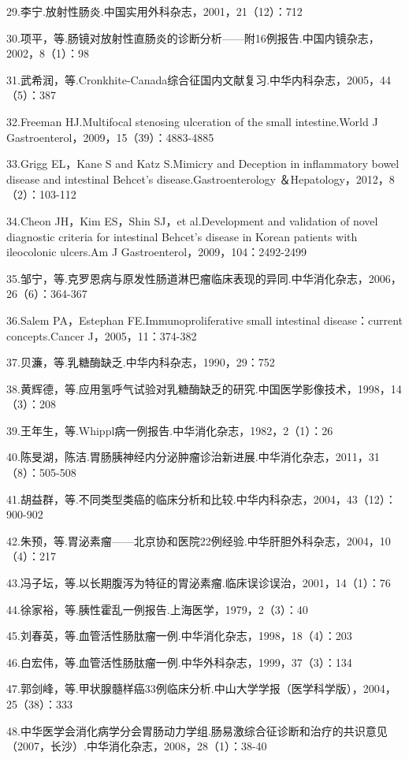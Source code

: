 29.李宁.放射性肠炎.中国实用外科杂志，2001，21（12）：712

30.项平，等.肠镜对放射性直肠炎的诊断分析------附16例报告.中国内镜杂志，2002，8（1）：98

31.武希润，等.Cronkhite-Canada综合征国内文献复习.中华内科杂志，2005，44（5）：387

32.Freeman HJ.Multifocal stenosing ulceration of the small
intestine.World J Gastroenterol，2009，15（39）：4883-4885

33.Grigg EL，Kane S and Katz S.Mimicry and Deception in inflammatory
bowel disease and intestinal Behcet's disease.Gastroenterology
＆Hepatology，2012，8（2）：103-112

34.Cheon JH，Kim ES，Shin SJ，et al.Development and validation of novel
diagnostic criteria for intestinal Behcet's disease in Korean patients
with ileocolonic ulcers.Am J Gastroenterol，2009，104：2492-2499

35.邹宁，等.克罗恩病与原发性肠道淋巴瘤临床表现的异同.中华消化杂志，2006，26（6）：364-367

36.Salem PA，Estephan FE.Immunoproliferative small intestinal
disease：current concepts.Cancer J，2005，11：374-382

37.贝濂，等.乳糖酶缺乏.中华内科杂志，1990，29：752

38.黄辉德，等.应用氢呼气试验对乳糖酶缺乏的研究.中国医学影像技术，1998，14（3）：208

39.王年生，等.Whippl病一例报告.中华消化杂志，1982，2（1）：26

40.陈旻湖，陈洁.胃肠胰神经内分泌肿瘤诊治新进展.中华消化杂志，2011，31（8）：505-508

41.胡益群，等.不同类型类癌的临床分析和比较.中华内科杂志，2004，43（12）：900-902

42.朱预，等.胃泌素瘤------北京协和医院22例经验.中华肝胆外科杂志，2004，10（4）：217

43.冯子坛，等.以长期腹泻为特征的胃泌素瘤.临床误诊误治，2001，14（1）：76

44.徐家裕，等.胰性霍乱一例报告.上海医学，1979，2（3）：40

45.刘春英，等.血管活性肠肽瘤一例.中华消化杂志，1998，18（4）：203

46.白宏伟，等.血管活性肠肽瘤一例.中华外科杂志，1999，37（3）：134

47.郭剑峰，等.甲状腺髓样癌33例临床分析.中山大学学报（医学科学版），2004，25（38）：333

48.中华医学会消化病学分会胃肠动力学组.肠易激综合征诊断和治疗的共识意见（2007，长沙）.中华消化杂志，2008，28（1）：38-40

\protect\hypertarget{text00193.html}{}{}

